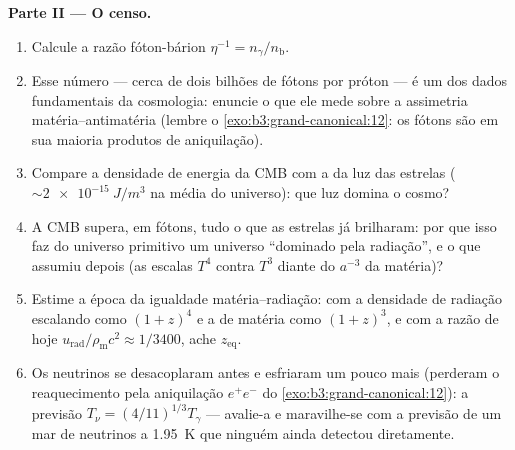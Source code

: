 \begin{problem}
\medskip\noindent\textbf{Parte II --- O censo.}
\begin{enumerate}[resume]
  \item Calcule a razão fóton-bárion $\eta^{-1} =
        n_\gamma/n_{\text{b}}$.
  \item Esse número --- cerca de dois bilhões de fótons por próton ---
        é um dos dados fundamentais da cosmologia: enuncie o que ele
        mede sobre a assimetria matéria--antimatéria (lembre o
        \cref{exo:b3:grand-canonical:12}: os fótons são em sua maioria
        produtos de aniquilação).
  \item Compare a densidade de energia da CMB com a da luz das estrelas
        ($\sim\qty{2e-15}{J/m^3}$ na média do universo):
        que luz domina o cosmo?
  \item A CMB supera, em fótons, tudo o que as estrelas já brilharam:
        por que isso faz do universo primitivo um universo
        ``dominado pela radiação'', e o que assumiu depois (as escalas
        $T^4$ contra $T^3$ diante do $a^{-3}$ da matéria)?
  \item Estime a época da igualdade matéria--radiação: com a densidade
        de radiação escalando como $(1+z)^4$ e a de matéria como
        $(1+z)^3$, e com a razão de hoje
        $u_{\text{rad}}/\rho_{\text{m}}c^2 \approx 1/3400$, ache
        $z_{\text{eq}}$.
  \item Os neutrinos se desacoplaram antes e esfriaram um pouco mais
        (perderam o reaquecimento pela aniquilação $e^+e^-$ do
        \cref{exo:b3:grand-canonical:12}): a previsão
        $T_\nu = (4/11)^{1/3}T_\gamma$ --- avalie-a e
        maravilhe-se com a previsão de um mar de neutrinos a
        \qty{1.95}{K} que ninguém ainda detectou diretamente.
\end{enumerate}


\end{problem}

